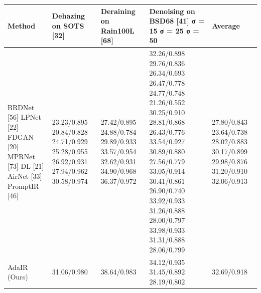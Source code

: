 \begin{tabular}{lllll}
\toprule
Method & Dehazing on SOTS [32] & Deraining on Rain100L [68] & Denoising on BSD68 [41] σ = 15 σ = 25 σ = 50 & Average \\
\midrule
BRDNet [56] LPNet [22] FDGAN [20] MPRNet [73] DL [21] AirNet [33] PromptIR [46] & 23.23/0.895 20.84/0.828 24.71/0.929 25.28/0.955 26.92/0.931 27.94/0.962 30.58/0.974 & 27.42/0.895 24.88/0.784 29.89/0.933 33.57/0.954 32.62/0.931 34.90/0.968 36.37/0.972 & 32.26/0.898 29.76/0.836 26.34/0.693 26.47/0.778 24.77/0.748 21.26/0.552 30.25/0.910 28.81/0.868 26.43/0.776 33.54/0.927 30.89/0.880 27.56/0.779 33.05/0.914 30.41/0.861 26.90/0.740 33.92/0.933 31.26/0.888 28.00/0.797 33.98/0.933 31.31/0.888 28.06/0.799 & 27.80/0.843 23.64/0.738 28.02/0.883 30.17/0.899 29.98/0.876 31.20/0.910 32.06/0.913 \\
AdaIR (Ours) & 31.06/0.980 & 38.64/0.983 & 34.12/0.935 31.45/0.892 28.19/0.802 & 32.69/0.918 \\
\bottomrule
\end{tabular}

